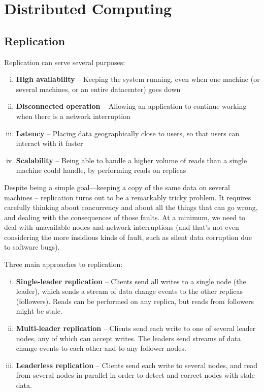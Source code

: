 \documentclass{article}
\begin{document}
\newpage    
\section{Distributed Computing}
    \subsection{Replication}
    Replication can serve several purposes:
    \begin{enumerate}[i.]
        \item \textbf{High availability} --  Keeping the system running, even when one machine (or several machines, or an  entire datacenter) goes down
        
        \item \textbf{Disconnected operation} -- Allowing an application to continue working when there is a network interruption
        
        \item \textbf{Latency} -- Placing data geographically close to users, so that users can interact with it faster

        \item \textbf{Scalability} -- Being able to handle a higher volume of reads than a single machine could handle, by performing reads on replicas
    \end{enumerate}
        
    Despite being a simple goal—keeping a copy of the same data on several machines -- replication turns out to be a remarkably tricky problem. It requires carefully thinking about concurrency and about all the things that can go wrong, and dealing with the consequences of those faults. At a minimum, we need to deal with unavailable nodes and network interruptions (and that’s not even considering the more insidious kinds of fault, such as silent data corruption due to software bugs).
        
    Three main approaches to replication:
    \begin{enumerate}[i.]
        \item \textbf{Single-leader replication} -- Clients send all writes to a single node (the leader), which sends a stream of data change events to the other replicas (followers). Reads can be performed on any replica, but reads from followers might be stale.
        
        \item \textbf{Multi-leader replication} -- Clients send each write to one of several leader nodes, any of which can accept writes. The leaders send streams of data change events to each other and to any follower nodes.
        
        \item \textbf{Leaderless replication} -- Clients send each write to several nodes, and read from several nodes in parallel in order to detect and correct nodes with stale data.
    \end{enumerate}
    
\end{document}
